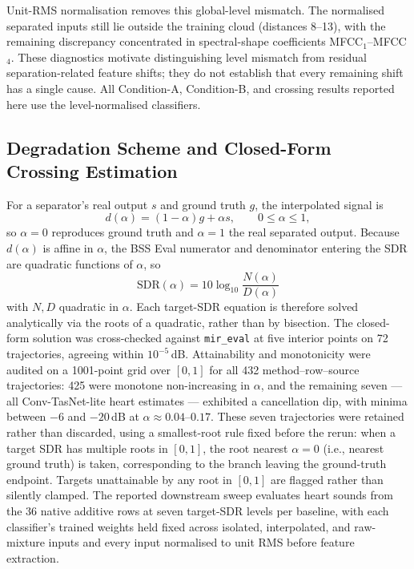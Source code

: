 \documentclass[journal]{IEEEtran}
\begin{document}
Unit-RMS normalisation removes this global-level mismatch. The normalised separated inputs still lie outside the training cloud (distances 8--13), with the remaining discrepancy concentrated in spectral-shape coefficients MFCC$_1$--MFCC$_4$. These diagnostics motivate distinguishing level mismatch from residual separation-related feature shifts; they do not establish that every remaining shift has a single cause. All Condition-A, Condition-B, and crossing results reported here use the level-normalised classifiers.

\subsection{Degradation Scheme and Closed-Form Crossing Estimation}

For a separator's real output $s$ and ground truth $g$, the interpolated signal is
\begin{equation}
    d(\alpha)=(1-\alpha)g+\alpha s,\qquad 0\leq\alpha\leq1,
    \label{eq:degradation}
\end{equation}
so $\alpha=0$ reproduces ground truth and $\alpha=1$ the real separated output. Because $d(\alpha)$ is affine in $\alpha$, the BSS Eval numerator and denominator entering the SDR are quadratic functions of $\alpha$, so
\[
\mathrm{SDR}(\alpha) = 10\log_{10}\frac{N(\alpha)}{D(\alpha)}
\]
with $N,D$ quadratic in $\alpha$. Each target-SDR equation is therefore solved analytically via the roots of a quadratic, rather than by bisection. The closed-form solution was cross-checked against \texttt{mir\_eval} at five interior points on 72 trajectories, agreeing within $10^{-5}$\,dB. Attainability and monotonicity were audited on a 1001-point grid over $[0,1]$ for all 432 method--row--source trajectories: 425 were monotone non-increasing in $\alpha$, and the remaining seven --- all Conv-TasNet-lite heart estimates --- exhibited a cancellation dip, with minima between $-6$ and $-20$\,dB at $\alpha\approx0.04$--$0.17$. These seven trajectories were retained rather than discarded, using a smallest-root rule fixed before the rerun: when a target SDR has multiple roots in $[0,1]$, the root nearest $\alpha=0$ (i.e., nearest ground truth) is taken, corresponding to the branch leaving the ground-truth endpoint. Targets unattainable by any root in $[0,1]$ are flagged rather than silently clamped. The reported downstream sweep evaluates heart sounds from the 36 native additive rows at seven target-SDR levels per baseline, with each classifier's trained weights held fixed across isolated, interpolated, and raw-mixture inputs and every input normalised to unit RMS before feature extraction.
\end{document}
